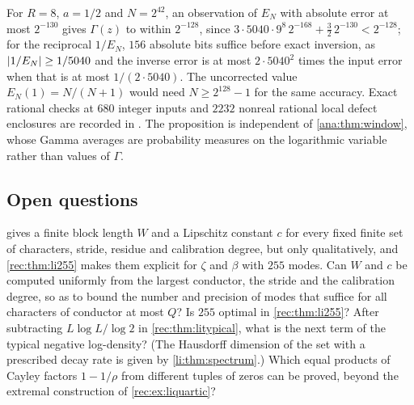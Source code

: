 For $R=8$, $a=1/2$ and $N=2^{42}$, an observation of $E_N$ with absolute error at most $2^{-130}$ gives
$\Gamma(z)$ to within $2^{-128}$, since $3\cdot5040\cdot9^8\,2^{-168}+\frac32\,2^{-130}<2^{-128}$; for
the reciprocal $1/E_N$, $156$ absolute bits suffice before exact inversion, as $\lvert1/E_N\rvert\ge1/5040$
and the inverse error is at most $2\cdot5040^2$ times the input error when that is at most
$1/(2\cdot5040)$. The uncorrected value $E_N(1)=N/(N+1)$ would need $N\ge2^{128}-1$ for the same
accuracy. Exact rational checks at $680$ integer inputs and $2232$ nonreal rational local defect
enclosures are recorded in . The proposition is
independent of \cref{ana:thm:window}, whose Gamma averages are probability measures on the logarithmic
variable rather than values of $\Gamma$.

\subsection{Open questions}\label{lih:sec:open}
{\raggedright{}}

\begin{question}
 gives a finite block length $W$ and a Lipschitz constant $c$ for
every fixed finite set of characters, stride, residue and calibration degree, but only qualitatively, and
\cref{rec:thm:li255} makes them explicit for $\zeta$ and $\beta$ with $255$ modes. Can $W$ and $c$ be computed uniformly
from the largest conductor, the stride and the calibration degree, so as to bound the number and precision of
modes that suffice for all characters of conductor at most $Q$? Is $255$ optimal in \cref{rec:thm:li255}? After subtracting $L\log L/\log2$ in
\cref{rec:thm:litypical}, what is the next term of the typical negative log-density? (The Hausdorff
dimension of the set with a prescribed decay rate is given by \cref{li:thm:spectrum}.) Which equal products of Cayley
factors $1-1/\rho$ from different tuples of zeros can be proved, beyond the extremal construction of
\cref{rec:ex:liquartic}?
\end{question}

